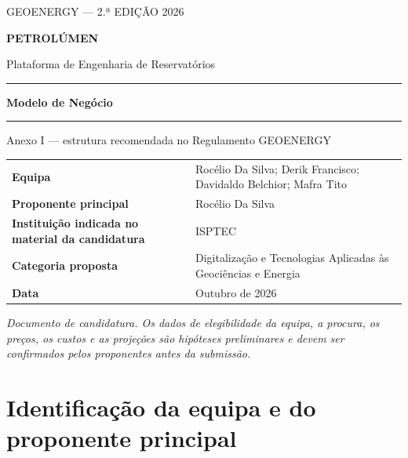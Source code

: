 \documentclass[11pt,a4paper]{article}
\begin{document}
\begin{titlepage}
  \thispagestyle{empty}
  \centering
  \vspace*{1.7cm}
  {\Large\textcolor{petrolgold}{GEOENERGY — 2.ª EDIÇÃO 2026}\par}
  \vspace{1.5cm}
  {\Huge\bfseries\textcolor{petrolblue}{PETROLÚMEN}\par}
  \vspace{0.5cm}
  {\Large Plataforma de Engenharia de Reservatórios\par}
  \vspace{1.5cm}
  \rule{\textwidth}{1.2pt}\par
  \vspace{0.4cm}
  {\LARGE\bfseries Modelo de Negócio\par}
  \vspace{0.4cm}
  \rule{\textwidth}{1.2pt}\par
  \vspace{1.2cm}
  {\large Anexo I — estrutura recomendada no Regulamento GEOENERGY\par}
  \vfill
  \begin{tabularx}{0.82\textwidth}{>{\bfseries}l X}
    Equipa & Rocélio Da Silva; Derik Francisco; Davidaldo Belchior; Mafra Tito \\
    Proponente principal & Rocélio Da Silva \\
    Instituição indicada no material da candidatura & ISPTEC \\
    Categoria proposta & Digitalização e Tecnologias Aplicadas às Geociências e Energia \\
    Data & Outubro de 2026 \\
  \end{tabularx}
  \vfill
  \begin{minipage}{0.86\textwidth}
    \small
    \textit{Documento de candidatura. Os dados de elegibilidade da equipa, a procura,
    os preços, os custos e as projeções são hipóteses preliminares e devem ser
    confirmados pelos proponentes antes da submissão.}
  \end{minipage}
  \vspace{0.8cm}
\end{titlepage}
\clearpage
{}

\section{Identificação da equipa e do proponente principal}
\end{document}
